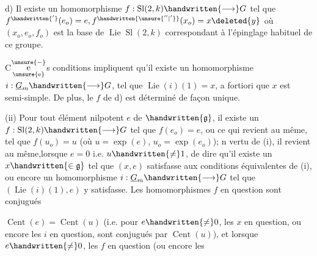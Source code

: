 d) Il existe un homomorphisme $f:\operatorname{Sl}(2,k)\handwritten{\longrightarrow}G$ tel que $f^{\handwritten{'}}(e_o)=e,f^{\handwritten{\unsure{''|'}}}(x_o)=x\deleted{y}$ où $(x_o,e_o,f_o)$ est la base de $\operatorname{Lie}\operatorname{Sl}(2,k)$ correspondant à l'épinglage habituel de ce groupe.

C$\overset{\unsure{-}}{\underset{\text{\unsure{e}}}{\text{e}}}$s conditions impliquent qu'il existe un homomorphisme $i:\underline{G}_m\handwritten{\longrightarrow}G$, tel que $\operatorname{Lie}(i)(1)=x$, a fortiori que $x$ est semi-simple. De plus, le $f$ de d) est déterminé de façon unique.

(ii) Pour tout élément nilpotent $e$ de $\handwritten{\mathfrak{g}}$, il existe un  $f:\operatorname{Sl}(2,k)\handwritten{\longrightarrow}G$ tel que $f(e_o)=e$, ou ce qui revient au même, tel que $f(u_o)=u$ (où $u=\exp(e)$, $u_o=\exp(e_o)$); n vertu de (i), il revient au même,\deleted{(}lorsque $e=0$ i\handwritten{/}.e. $u\handwritten{\ne}1$, de dire qu'il existe un $x\handwritten{\in\mathfrak{g}}$ tel que $(x,e)$ satisfasse aux conditions équivalentes de (i), ou encore un homomorphisme $i:\underline{G}_m\handwritten{\longrightarrow}G$ tel que $(\operatorname{Lie}(i)(1),e)$ y satisfasse. Les homomorphismes $f$ en question sont conjugués
$\operatorname{Cent}(e)=\operatorname{Cent}(u)$ (i.e. pour $e\handwritten{\ne}0$, les $x$ en question, ou encore les $i$ en question, sont conjugués  par $\operatorname{Cent}(u)$), et lorsque $e\handwritten{\ne}0$, les  $f$ en question (ou encore les

